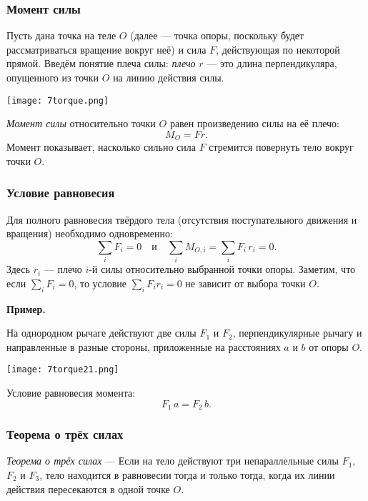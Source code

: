 \documentclass[12pt, a4paper]{article}%
\begin{document}
\subsubsection*{Момент силы}

Пусть дана точка на теле \(O\) (далее --- точка опоры, поскольку будет рассматриваться вращение вокруг неё) и сила \(F\), 
действующая по некоторой прямой. Введём понятие плеча силы: \textit{плечо} \(r\) — это длина перпендикуляра, опущенного из точки \(O\) 
на линию действия силы.

\begin{center}
\texttt{[image: 7torque.png]}
\label{fig:mpr}
\end{center}

\textit{Момент силы} относительно точки \(O\) равен произведению силы на её плечо:
\[
M_O = Fr.
\]
Момент показывает, насколько сильно сила $F$ стремится повернуть тело вокруг точки \(O\).

\subsubsection*{Условие равновесия}

Для полного равновесия твёрдого тела (отсутствия поступательного движения и вращения) необходимо одновременно:
\[
\sum_i F_i = 0
\quad\text{и}\quad
\sum_i M_{O,i} = \sum_i F_i\,r_i = 0.
\]
Здесь \(r_i\) — плечо \(i\)-й силы относительно выбранной точки опоры. Заметим, что если \(\sum_i F_i=0\), то условие \(\sum_i F_i r_i=0\) не зависит от выбора точки \(O\).

\textbf{Пример.}

На однородном рычаге действуют две силы \(F_1\) и \(F_2\), перпендикулярные рычагу и направленные в 
разные стороны, приложенные на расстояниях \(a\) и \(b\) от опоры \(O\). 

\begin{center}
\texttt{[image: 7torque21.png]}
\label{fig:mpr}
\end{center}


Условие равновесия момента:
\[
F_1\,a = F_2\,b.
\]

\subsubsection*{Теорема о трёх силах}

\textit{Теорема о трёх силах} --- Если на тело действуют три непараллельные силы \(F_1\), \(F_2\) и \(F_3\), тело находится в равновесии тогда и только
тогда, когда их линии действия пересекаются в одной точке \(O\). 
\end{document}
